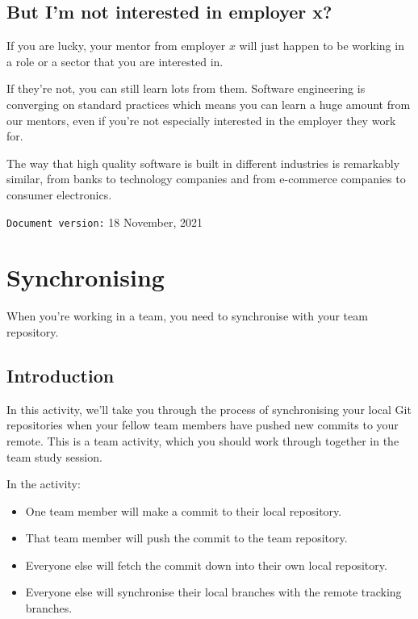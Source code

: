 \documentclass[
]{book}
\providecommand{\tightlist}{%
  \setlength{\itemsep}{0pt}\setlength{\parskip}{0pt}}
\begin{document}
\hypertarget{dontcare}{%
\section{But I'm not interested in employer x?}\label{dontcare}}

If you are lucky, your mentor from employer \(x\) will just happen to be working in a role or a sector that you are interested in.

If they're not, you can still learn lots from them. Software engineering is converging on standard practices which means you can learn a huge amount from our mentors, even if you're not especially interested in the employer they work for.

The way that high quality software is built in different industries is remarkably similar, from banks to technology companies and from e-commerce companies to consumer electronics.

\texttt{Document\ version:} 18 November, 2021

\hypertarget{syncing}{%
\chapter{Synchronising}\label{syncing}}

When you're working in a team, you need to synchronise with your team repository.

\hypertarget{syncintro}{%
\section{Introduction}\label{syncintro}}

In this activity, we'll take you through the process of synchronising your local Git repositories when your fellow team members have pushed new commits to your remote. This is a team activity, which you should work through together in the team study session.

In the activity:

\begin{itemize}
\tightlist
\item
  One team member will make a commit to their local repository.
\item
  That team member will push the commit to the team repository.
\item
  Everyone else will fetch the commit down into their own local repository.
\item
  Everyone else will synchronise their local branches with the remote tracking branches.
\end{itemize}
\end{document}
